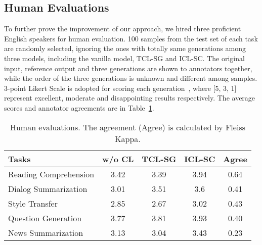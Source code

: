 






\subsection{Human Evaluations}

To further prove the improvement of our approach, we hired three proficient English speakers for human evaluation. 100 samples from the test set of each task are randomly selected, ignoring the ones with totally same generations among three models, including the vanilla model, TCL-SG and ICL-SC. The original input, reference output and three generations are shown to annotators together, while the order of the three generations is unknown and different among samples. 3-point Likert Scale is adopted for scoring each generation~\cite{gliwa2019samsum}, where [5, 3, 1] represent 
excellent, moderate and disappointing results 
respectively. The average scores and annotator agreements 
are in 
Table~\ref{tab:humaneval}.
\begin{table}[h]
	\scriptsize
	\centering
	\begin{tabular}{l|ccc|c}
		\hline
		{Tasks} & {w/o CL} & {TCL-SG} & {ICL-SC} & {Agree}  \\
		\hline
		Reading Comprehension  &3.42 & 3.39 &3.94 &0.64 \\
		Dialog Summarization &3.01 &3.51 &3.6 &0.41 \\
		Style Transfer &2.85 &2.67 & 3.02&0.43 \\
		Question Generation &3.77 & 3.81 &3.93 &0.40 \\
		News Summarization & 3.13 &3.04 &3.43 &0.23 \\
		\hline
	\end{tabular}
	\caption{Human evaluations. The agreement (Agree) is calculated by Fleiss Kappa.}
	\label{tab:humaneval}
\end{table}

